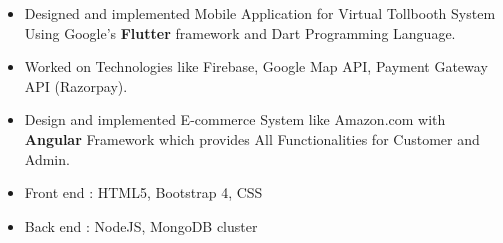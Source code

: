 \documentclass[10pt,a4paper,ragged2e]{altacv}
\begin{document}

\begin{fullwidth}
\makecvheader
\end{fullwidth}


\smallskip
{}
\begin{itemize}
\item Designed and implemented Mobile Application for Virtual Tollbooth System Using Google's \textbf{Flutter} framework and  Dart Programming Language.
\smallskip
\item Worked on Technologies like  Firebase, Google Map API, Payment Gateway API (Razorpay).
\smallskip
\smallskip
\end{itemize}

\divider

\begin{itemize}
\item Design and  implemented E-commerce System like Amazon.com with \textbf{Angular} Framework which provides All Functionalities for Customer and Admin.
\smallskip
\item Front end : HTML5, Bootstrap 4, CSS
\item Back end : NodeJS, MongoDB cluster
\smallskip
\end{itemize}
\end{document}
